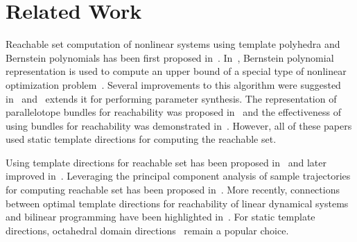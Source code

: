 \section{Related Work}

Reachable set computation of nonlinear systems using template polyhedra and Bernstein polynomials has been first proposed in~\cite{dang2009image}.
%
In~\cite{dang2009image}, Bernstein polynomial representation is used to compute an upper bound of a special type of nonlinear optimization problem~\cite{garloff2003bernstein}.
%
Several improvements to this algorithm were suggested in~\cite{dang2012reachability,sassi2012reachability} and~\cite{dang2014parameter} extends it for performing parameter synthesis.
%
The representation of parallelotope bundles for reachability was proposed in~\cite{dreossi2016parallelotope} and the effectiveness of using bundles for reachability was demonstrated in~\cite{dreossi2017sapo,dreossi2017reachability}.
%
However, all of these papers used static template directions for computing the reachable set.

Using template directions for reachable set has been proposed in~\cite{sankaranarayanan2008symbolic} and later improved in~\cite{dang2011template}.
%
Leveraging the principal component analysis of sample trajectories for computing reachable set has been proposed in~\cite{stursberg2003efficient,chen2011choice,seladji2017finding}.
%
More recently, connections between optimal template directions for reachability of linear dynamical systems and bilinear programming have been highlighted in~\cite{gronski2019template}.
%
For static template directions, octahedral domain directions~\cite{clariso2004octahedron} remain a popular choice.

